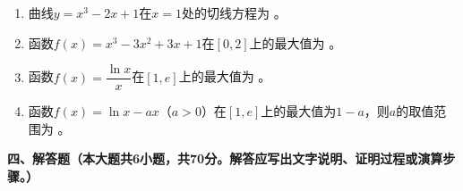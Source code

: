 \documentclass[12pt, a4paper]{ctexart}
\begin{document}
\begin{enumerate}[label=\arabic*.]

\item 曲线$y=x^3-2x+1$在$x=1$处的切线方程为 \underline{\hspace{3cm}}。

\item 函数$f(x)=x^3-3x^2+3x+1$在$[0,2]$上的最大值为 \underline{\hspace{3cm}}。

\item 函数$f(x)=\dfrac{\ln x}{x}$在$[1,e]$上的最大值为 \underline{\hspace{3cm}}。

\item 函数$f(x)=\ln x-ax$（$a>0$）在$[1,e]$上的最大值为$1-a$，则$a$的取值范围为 \underline{\hspace{3cm}}。

\end{enumerate}

\vspace{0.5em}

\noindent\textbf{四、解答题（本大题共6小题，共70分。解答应写出文字说明、证明过程或演算步骤。）}
\end{document}
